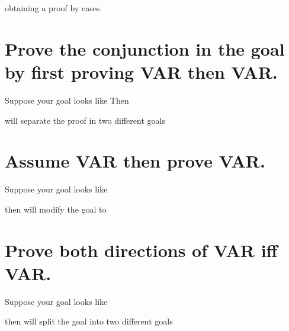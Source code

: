 
obtaining a proof by cases.

\section{Prove the conjunction in the goal by first proving VAR then VAR.}
Suppose your goal looks like
 Then 
 
 will separate the proof in two different goals
 

 
\section{Assume VAR then prove VAR.}
Suppose your goal looks like

then 
will modify the goal to




\section{Prove both directions of VAR iff VAR.}

Suppose your goal looks like

then 
will split the goal into two different goals


